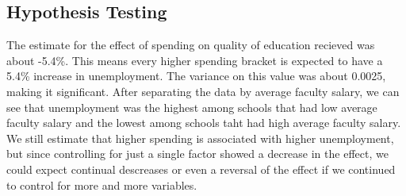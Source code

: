 \documentclass{article}
\begin{document}
\subsection{Hypothesis Testing}
The estimate for the effect of spending on quality of education recieved was about -5.4\%. This means every higher spending bracket is expected to have a 5.4\% increase in unemployment. The variance on this value was about 0.0025, making it significant. After separating the data by average faculty salary, we can see that unemployment was the highest among schools that had low average faculty salary and the lowest among schools taht had high average faculty salary. We still estimate that higher spending is associated with higher unemployment, but since controlling for just a single factor showed a decrease in the effect, we could expect continual descreases or even a reversal of the effect if we continued to control for more and more variables.
\end{document}
